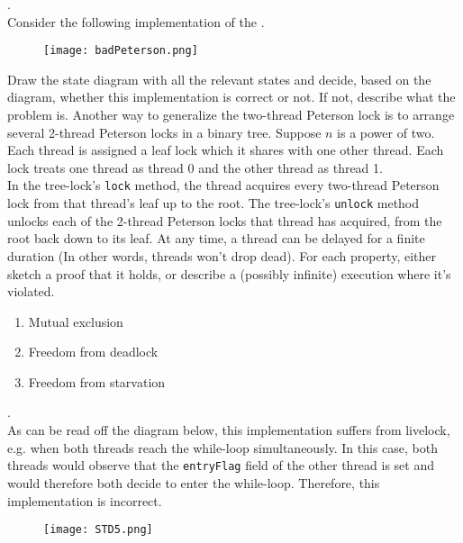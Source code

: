 \documentclass[main]{subfiles}
\begin{document}
\begin{ExerciseList}
        
        \Exercise[title={Peterson's},label=IP].\quad \\
            \Question Consider the following implementation of the .
                \begin{figure}[H]
                    \centering
                    \texttt{[image: badPeterson.png]}
                \end{figure}
                Draw the state diagram with all the relevant states and decide, based on the diagram, whether this implementation is correct or not. If not, describe what the problem is.
            \Question Another way to generalize the two-thread Peterson lock is to arrange several 2-thread Peterson locks in a binary tree. Suppose $n$ is a power of two.\\[3mm]
                Each thread is assigned a leaf lock which it shares with one other thread. Each lock treats one thread as thread 0 and the other thread as thread 1.\\[3mm]
                In the tree-lock's \texttt{lock} method, the thread acquires every two-thread Peterson lock from that thread's leaf up to the root. The tree-lock's \texttt{unlock} method unlocks each of the 2-thread Peterson locks that thread has acquired, from the root back down to its leaf. At any time, a thread can be delayed for a finite duration (In other words, threads won't drop dead). For each property, either sketch a proof that it holds, or describe a (possibly infinite) execution where it's violated.
                \begin{enumerate}
                    \item Mutual exclusion
                    \item Freedom from deadlock
                    \item Freedom from starvation
                \end{enumerate}
        \Answer[ref={IP}].\quad \\
            \Question As can be read off the diagram below, this implementation suffers from livelock, e.g. when both threads reach the while-loop simultaneously. In this case, both threads would observe that the \texttt{entryFlag} field of the other thread is set and would therefore both decide to enter the while-loop. Therefore, this implementation is incorrect.
            \begin{figure}[H]
                \centering
                \texttt{[image: STD5.png]}
            \end{figure}

\end{ExerciseList}
\end{document}
